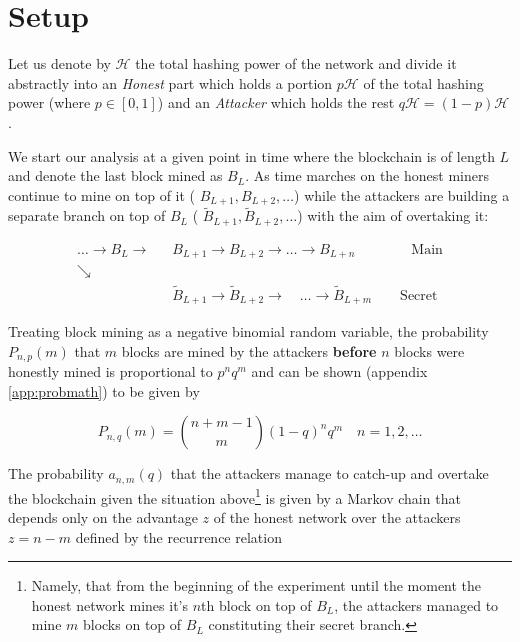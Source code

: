 \documentclass[letterpaper,12pt]{report}
\theoremstyle{plain}
\theoremstyle{definition}
\begin{document}
\section{Setup}\label{calcsetup}
Let us denote by $\mathcal{H}$ the total hashing power of the network and divide it abstractly into an \emph{Honest} part which holds a portion $p\mathcal{H}$ of the total hashing power (where $p \in [0,1]$) and an \emph{Attacker} which holds the rest $q\mathcal{H}=(1-p)\mathcal{H}$. 

We start our analysis at a given point in time where the blockchain is of length $L$ and denote the last block mined as $\mathit{B}_L$. As time marches on the honest miners continue to mine on top of it ( $\mathit{B}_{L+1}, \mathit{B}_{L+2}, \dots$) while the attackers are building a separate branch on top of $\mathit{B}_L$ ( $\mathit{\tilde{B}}_{L+1}, \mathit{\tilde{B}}_{L+2}, \dots$) with the aim of overtaking it:

\begin{eqnarray}\label{blockwithholdingchain}
 \dots \rightarrow \mathit{B}_L\rightarrow &\mathit{B}_{L+1}\rightarrow\mathit{B}_{L+2}
\rightarrow\dots\rightarrow\mathit{B}_{L+n} \qquad\qquad \mathrm{Main}\\\nonumber
\searrow & \\\nonumber
\qquad \qquad \qquad & \widetilde{\mathit{B}}_{L+1}\rightarrow\widetilde{\mathit{B}}_{L+2}
\longrightarrow \quad \dots \longrightarrow\widetilde{\mathit{B}}_{L+m}\qquad \mathrm{Secret}
\end{eqnarray}

Treating block mining as a negative binomial random variable, the probability $\mathit{P_{n,p}(m)}$ that $m$ blocks are mined by the attackers {\bf before} $n$ blocks were honestly mined is proportional to $p^nq^m$ and can be shown
(appendix \ref{app:probmath}) to be given by

\begin{equation}\label{eq:pnm}
\mathit{P}_{n,q}(m)={n + m -1\choose m}(1-q)^nq^m \quad n=1,2,\dots
\end{equation}

The probability $\mathit{a}_{n,m}(q)$ that the attackers manage to catch-up and overtake the blockchain given the situation above\footnote{Namely, that from the beginning of the experiment until the moment the honest network mines it's $n$th block on top of $\mathit{B}_L$, the attackers managed to mine $m$ blocks on top of $\mathit{B}_L$ constituting their secret branch.} is given by a Markov chain that depends only on the advantage $z$ of the honest network over the attackers $z=n-m$ defined by the recurrence relation
\end{document}
